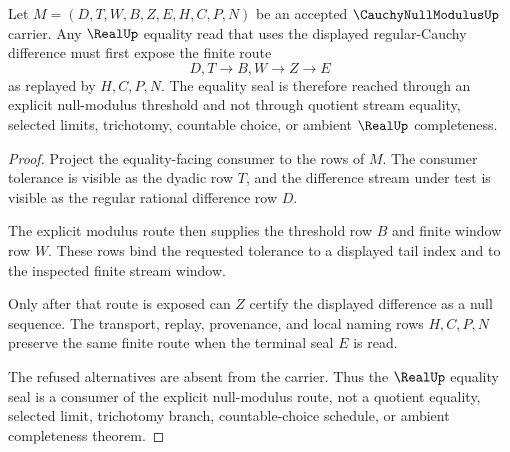 \begin{theorem}
\label{thm:cauchy-null-modulus-real-equality-route}
Let $M=(D,T,W,B,Z,E,H,C,P,N)$ be an accepted $\CauchyNullModulusUp$ carrier. Any $\RealUp$ equality read that uses the displayed regular-Cauchy difference must first expose the finite route
$$
D,T \longrightarrow B,W \longrightarrow Z \longrightarrow E
$$
as replayed by $H,C,P,N$. The equality seal is therefore reached through an explicit null-modulus threshold and not through quotient stream equality, selected limits, trichotomy, countable choice, or ambient $\RealUp$ completeness.
\end{theorem}
\begin{proof}
Project the equality-facing consumer to the rows of $M$. The consumer tolerance is visible as the dyadic row $T$, and the difference stream under test is visible as the regular rational difference row $D$.

The explicit modulus route then supplies the threshold row $B$ and finite window row $W$. These rows bind the requested tolerance to a displayed tail index and to the inspected finite stream window.

Only after that route is exposed can $Z$ certify the displayed difference as a null sequence. The transport, replay, provenance, and local naming rows $H,C,P,N$ preserve the same finite route when the terminal seal $E$ is read.

The refused alternatives are absent from the carrier. Thus the $\RealUp$ equality seal is a consumer of the explicit null-modulus route, not a quotient equality, selected limit, trichotomy branch, countable-choice schedule, or ambient completeness theorem.
\end{proof}


